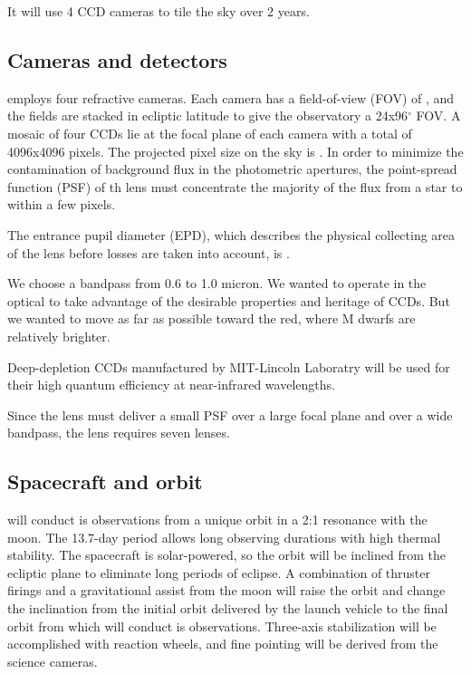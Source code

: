 \documentclass{emulateapj}
\begin{document}
It will use 4 CCD cameras to tile the sky over 2 years.

\subsection{Cameras and detectors} 

\tess employs four refractive cameras. Each camera has a field-of-view (FOV) of \fov, and the fields are stacked in ecliptic latitude to give the observatory a 24x96$^{\circ}$ FOV. A mosaic of four CCDs lie at the focal plane of each camera with a total of 4096x4096 pixels. The projected pixel size on the sky is \pixsz. In order to minimize the contamination of background flux in the photometric apertures, the point-spread function (PSF) of th lens must concentrate the majority of the flux from a star to within a few pixels. 

The entrance pupil diameter (EPD), which describes the physical collecting area of the lens before losses are taken into account, is \epd.

We choose a bandpass from 0.6 to 1.0 micron. We wanted to operate in
the optical to take advantage of the desirable properties and heritage
of CCDs. But we wanted to move as far as possible toward the red,
where M dwarfs are relatively brighter.

Deep-depletion CCDs manufactured by MIT-Lincoln Laboratry will be used for their high quantum efficiency at near-infrared wavelengths.

Since the lens must deliver a small PSF over a large focal plane and over a wide bandpass, the lens requires seven lenses.


\subsection{Spacecraft and orbit} 
\tess will conduct is observations from a unique orbit in a 2:1 resonance with the moon. The 13.7-day period allows long observing durations with high thermal stability.
The spacecraft is solar-powered, so the orbit will be inclined from the ecliptic plane to eliminate long periods of eclipse. 
A combination of thruster firings and a gravitational assist from the moon will raise the orbit and change the inclination from the initial orbit delivered by the launch vehicle to the final orbit from which \tess will conduct is observations.
Three-axis stabilization will be accomplished with reaction wheels, and fine pointing will be derived from the science cameras.
\end{document}
